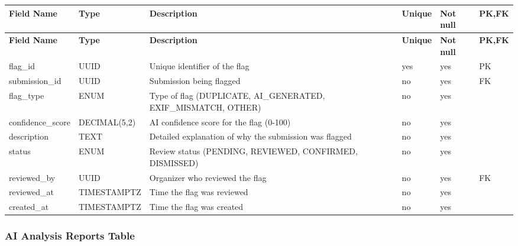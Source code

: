 \vspace{0.5em}
\renewcommand{\arraystretch}{1.15}
\setlength{\tabcolsep}{4pt}
\small
\begin{longtable}{|>{\raggedright\arraybackslash}p{}|>{\raggedright\arraybackslash}p{}|>{\raggedright\arraybackslash}p{}|>{\centering\arraybackslash}p{}|>{\centering\arraybackslash}p{}|>{\centering\arraybackslash}p{}|}
\hline
\textbf{Field Name} & \textbf{Type} & \textbf{Description} & \textbf{Unique} & \textbf{Not null} & \textbf{PK,FK} \\
\hline
\endfirsthead
\textbf{Field Name} & \textbf{Type} & \textbf{Description} & \textbf{Unique} & \textbf{Not null} & \textbf{PK,FK} \\
\hline
\endhead
flag\_id & UUID & Unique identifier of the flag & yes & yes & PK \\
\hline
submission\_id & UUID & Submission being flagged & no & yes & FK \\
\hline
flag\_type & ENUM & Type of flag (DUPLICATE, AI\_GENERATED, EXIF\_MISMATCH, OTHER) & no & yes & \\
\hline
confidence\_score & DECIMAL(5,2) & AI confidence score for the flag (0-100) & no & yes & \\
\hline
description & TEXT & Detailed explanation of why the submission was flagged & no & yes & \\
\hline
status & ENUM & Review status (PENDING, REVIEWED, CONFIRMED, DISMISSED) & no & yes & \\
\hline
reviewed\_by & UUID & Organizer who reviewed the flag & no & yes & FK \\
\hline
reviewed\_at & TIMESTAMPTZ & Time the flag was reviewed & no & yes & \\
\hline
created\_at & TIMESTAMPTZ & Time the flag was created & no & yes & \\
\hline
\end{longtable}

\vspace{1em}
\subsubsection{AI Analysis Reports Table}
\label{subsubsec:ai-analysis-reports-table}

